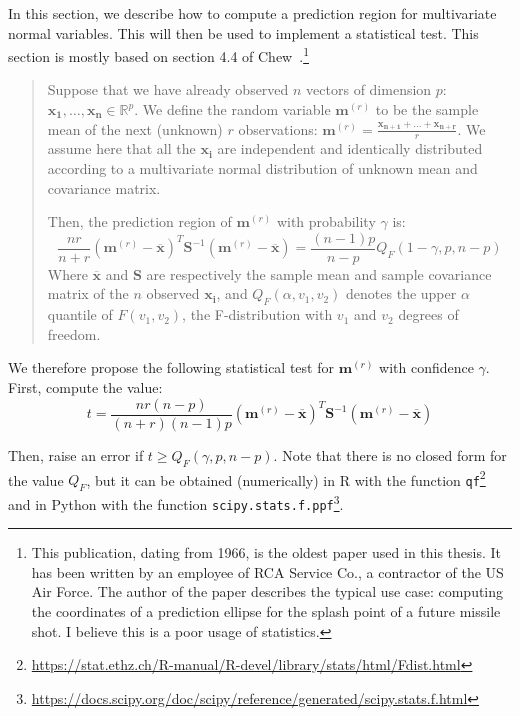             In this section, we describe how to compute a prediction region for multivariate normal variables. This will
            then be used to implement a statistical test.  This section is mostly based on section 4.4 of
            Chew~\cite{chew}.\footnote{This publication, dating from 1966, is the oldest paper used in this thesis. It
            has been written by an employee of RCA Service Co., a contractor of the US Air Force. The author of the
            paper describes the typical use case: computing the coordinates of a prediction ellipse for the splash point
            of a future missile shot. I believe this is a poor usage of statistics.}
            \begin{quote}
                Suppose that we have already observed \(n\) vectors of dimension \(p\): \(\bm{x_1},\dots,\bm{x_n} \in
                \mathbb{R}^p\). We define the random variable \(\bm{m}^{(r)}\) to be the sample mean of the next (unknown)
                \(r\) observations: \(\bm{m}^{(r)}= \frac{\bm{x_{n+1}}+\dots+\bm{x_{n+r}}}{r}\). We assume here that all the
                \(\bm{x_i}\) are independent and identically distributed according to a multivariate normal distribution
                of unknown mean and covariance matrix.

                Then, the prediction region of \(\bm{m}^{(r)}\) with probability \(\gamma\) is:
                \[
                \frac{nr}{n+r} (\bm{m}^{(r)} - \overline{\bm{x}})^T \bm{S}^{-1}(\bm{m}^{(r)} -
                \overline{\bm{x}})
                =
                \frac{(n-1)p}{n-p} Q_F(1-\gamma, p, n-p)
                 \]
                Where \(\overline{\bm{x}}\) and \(\bm{S}\) are respectively the sample mean and sample covariance matrix of
                the \(n\) observed \(\bm{x_i}\), and \(Q_F(\alpha,v_1,v_2)\) denotes the upper \(\alpha\) quantile of
                \(F(v_1, v_2)\), the F-distribution with \(v_1\) and \(v_2\) degrees of freedom.
            \end{quote}

            We therefore propose the following statistical test for \(\bm{m}^{(r)}\) with confidence \(\gamma\). First,
            compute the value:
            \[
            t = \frac{nr(n-p)}{(n+r)(n-1)p} (\bm{m}^{(r)} - \overline{\bm{x}})^T \bm{S}^{-1}(\bm{m}^{(r)} -
            \overline{\bm{x}})
             \]

            Then, raise an error if \(t \geq Q_F(\gamma, p, n-p)\).  Note that there is no closed form for the value
            \(Q_F\), but it can be obtained (numerically) in R with the function
            \texttt{qf}\footnote{\url{https://stat.ethz.ch/R-manual/R-devel/library/stats/html/Fdist.html}} and in Python
            with the function
            \texttt{scipy.stats.f.ppf}\footnote{\url{https://docs.scipy.org/doc/scipy/reference/generated/scipy.stats.f.html}}.

